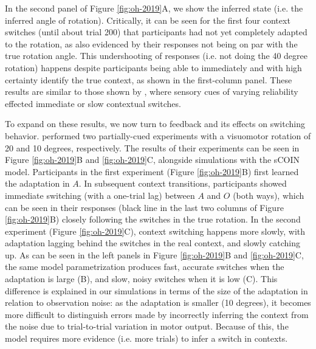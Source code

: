 \documentclass[a4paper,doc,floatsintext,natbib]{apa6}
\def \fref #1{Figure \ref{#1}}     %
\begin{document}
In the second panel of \fref{fig:oh-2019}A, we show the inferred state (i.e. the inferred angle of rotation). Critically, it can be seen for the first four context switches (until about trial 200) that participants had not yet completely adapted to the rotation, as also evidenced by their responses not being on par with the true rotation angle. This undershooting of responses (i.e. not doing the 40 degree rotation) happens despite participants being able to immediately and with high certainty identify the true context, as shown in the first-column panel. These results are similar to those shown by \cite{Imamizu_Explicit_2007}, where sensory cues of varying reliability effected immediate or slow contextual switches.

To expand on these results, we now turn to feedback and its effects on switching behavior. \cite{Oh_Minimizing_2019} performed two partially-cued experiments with a visuomotor rotation of 20 and 10 degrees, respectively. The results of their experiments can be seen in \fref{fig:oh-2019}B and \ref{fig:oh-2019}C, alongside simulations with the sCOIN model. Participants in the first experiment (\fref{fig:oh-2019}B) first learned the adaptation in $A$. In subsequent context transitions, participants showed immediate switching (with a one-trial lag) between $A$ and $O$ (both ways), which can be seen in their responses (black line in the last two columns of \fref{fig:oh-2019}B) closely following the switches in the true rotation. In the second experiment (\fref{fig:oh-2019}C), context switching happens more slowly, with adaptation lagging behind the switches in the real context, and slowly catching up. As can be seen in the left panels in \fref{fig:oh-2019}B and \ref{fig:oh-2019}C, the same model parametrization produces fast, accurate switches when the adaptation is large (B), and slow, noisy switches when it is low (C). This difference is explained in our simulations in terms of the size of the adaptation in relation to observation noise: as the adaptation is smaller (10 degrees), it becomes more difficult to distinguish errors made by incorrectly inferring the context from the noise due to trial-to-trial variation in motor output. Because of this, the model requires more evidence (i.e. more trials) to infer a switch in contexts.
\end{document}
